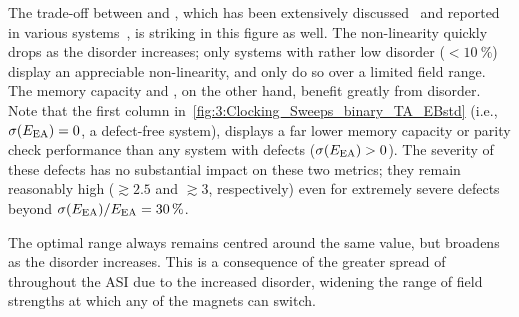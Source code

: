 The trade-off between  and , which has been extensively discussed~\cite{dambre2012information,MemoryNonlinearityReservoirs,RC_BeyondMemoryNonlinearity,RC_unification} and reported in various systems~\cite{DynamicEmergence_NanomagneticSystem,RC_TaskAgnosticMetrics_v2,TaskAdaptivePRC}, is striking in this figure as well.
The non-linearity quickly drops as the disorder increases; only systems with rather low disorder ($< \SI{10}{\percent}$) display an appreciable non-linearity, and only do so over a limited field range.
The memory capacity and , on the other hand, benefit greatly from disorder.
Note that the first column in~\cref{fig:3:Clocking_Sweeps_binary_TA_EBstd} (i.e., $\sigma(E_\mathrm{EA}) = 0$, a defect-free system), displays a far lower memory capacity or parity check performance than any system with defects ($\sigma(E_\mathrm{EA}) > 0$).
The severity of these defects has no substantial impact on these two metrics; they remain reasonably high ($\gtrsim 2.5$ and $\gtrsim 3$, respectively) even for extremely severe defects beyond $\sigma(E_\mathrm{EA})/E_\mathrm{EA}=\SI{30}{\percent}$. \par
The optimal  range always remains centred around the same value, but broadens as the disorder increases.
This is a consequence of the greater spread of  throughout the ASI due to the increased disorder, widening the range of field strengths at which any of the magnets can switch.

